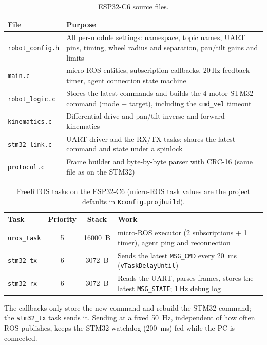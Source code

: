 \documentclass[12pt,a4paper]{article}
\begin{document}
\begin{table}[H]
\centering
\caption{ESP32-C6 source files.}
\label{pr3:tab:espfiles}
\small
\begin{tabularx}{\linewidth}{l >{\raggedright\arraybackslash}X}
\toprule
File & Purpose \\
\midrule
\texttt{robot\_config.h} & All per-module settings: namespace, topic names, UART pins, timing, wheel radius and separation, pan/tilt gains and limits \\
\texttt{main.c} & micro-ROS entities, subscription callbacks, 20\,Hz feedback timer, agent connection state machine \\
\texttt{robot\_logic.c} & Stores the latest commands and builds the 4-motor STM32 command (mode + target), including the \texttt{cmd\_vel} timeout \\
\texttt{kinematics.c} & Differential-drive and pan/tilt inverse and forward kinematics \\
\texttt{stm32\_link.c} & UART driver and the RX/TX tasks; shares the latest command and state under a spinlock \\
\texttt{protocol.c} & Frame builder and byte-by-byte parser with CRC-16 (same file as on the STM32) \\
\bottomrule
\end{tabularx}
\end{table}

\begin{table}[H]
\centering
\caption{FreeRTOS tasks on the ESP32-C6 (micro-ROS task values are the project defaults in \texttt{Kconfig.projbuild}).}
\label{pr3:tab:esptasks}
\small
\begin{tabularx}{\linewidth}{l c c >{\raggedright\arraybackslash}X}
\toprule
Task & Priority & Stack & Work \\
\midrule
\texttt{uros\_task}  & 5 & \SI{16000}{B} & micro-ROS executor (2 subscriptions + 1 timer), agent ping and reconnection \\
\texttt{stm32\_tx}   & 6 & \SI{3072}{B}  & Sends the latest \texttt{MSG\_CMD} every \SI{20}{ms} (\texttt{vTaskDelayUntil}) \\
\texttt{stm32\_rx}   & 6 & \SI{3072}{B}  & Reads the UART, parses frames, stores the latest \texttt{MSG\_STATE}; 1\,Hz debug log \\
\bottomrule
\end{tabularx}
\end{table}

The callbacks only store the new command and rebuild the STM32 command; the
\texttt{stm32\_tx} task sends it. Sending at a fixed \SI{50}{Hz}, independent of how often
ROS publishes, keeps the STM32 watchdog (\SI{200}{ms}) fed while the PC is connected.
\end{document}
